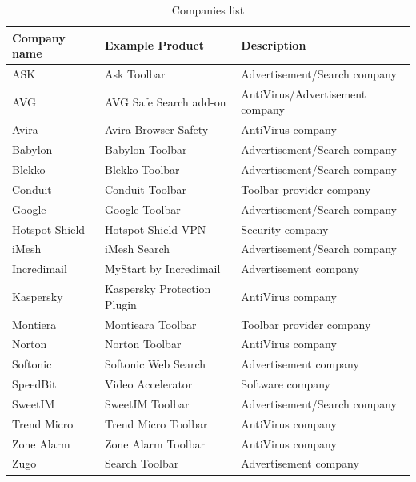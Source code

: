 \documentclass[11pt,oneside]{book}
\begin{document}
{{{{%
\begin{table}[h]
\centering
\caption{Companies list}
\label{table:companies_list}
\begin{tabular}{@{}lll@{}}
\toprule
{\bf Company name} & {\bf Example Product}               & {\bf Description}               \\ \midrule
ASK                & Ask Toolbar                 & Advertisement/Search company    \\
AVG                & AVG Safe Search add-on      & AntiVirus/Advertisement company \\
Avira              & Avira Browser Safety        & AntiVirus company               \\
Babylon            & Babylon Toolbar             & Advertisement/Search company    \\
Blekko             & Blekko Toolbar              & Advertisement/Search company    \\
Conduit            & Conduit Toolbar             & Toolbar provider company        \\
Google             & Google Toolbar              & Advertisement/Search company    \\
Hotspot Shield     & Hotspot Shield VPN          & Security company                \\
iMesh              & iMesh Search                & Advertisement/Search company    \\
Incredimail        & MyStart by Incredimail      & Advertisement company           \\
Kaspersky          & Kaspersky Protection Plugin & AntiVirus company               \\
Montiera           & Montieara Toolbar            & Toolbar provider company        \\
Norton             & Norton Toolbar              & AntiVirus company               \\
Softonic           & Softonic Web Search         & Advertisement company           \\
SpeedBit           & Video Accelerator           & Software company                \\
SweetIM            & SweetIM Toolbar             & Advertisement/Search company    \\
Trend Micro        & Trend Micro Toolbar         & AntiVirus company               \\
Zone Alarm         & Zone Alarm Toolbar          & AntiVirus company               \\ 
Zugo               & Search Toolbar              & Advertisement company           \\ \bottomrule
\end{tabular}
\end{table}

}}}}
\end{document}
